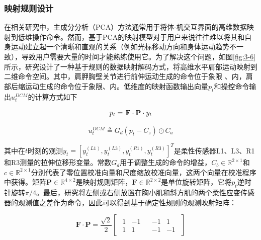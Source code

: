\subsubsection{映射规则设计}
在相关研究中，主成分分析（PCA）方法通常用于将体-机交互界面的高维数据映射到低维操作命令\cite{casadioBodyMachineInterface2011,seanez-gonzalezStaticDynamicDecoding2017}。然而，基于PCA的映射模型对于用户来说往往难以将其和自身运动建立起一个清晰和直观的关系（例如光标移动方向和身体运动趋势不一致），导致用户需要大量的时间才能熟练使用它。为了解决这个问题，如图\ref{fig:3-6}所示，研究设计了一种基于规则的数据映射解码方式，将高维水平肩部运动映射到二维命令空间。其中，肩胛胸壁关节进行前伸运动生成的命令位于象限 \uppercase\expandafter{}、\uppercase\expandafter{}内，肩部后缩运动生成的命令位于象限\uppercase\expandafter{}、\uppercase\expandafter{}内。低维度的映射函数输出向量${p_t}$和操控命令输出$u_t^{DCM}$的计算方式如下

\begin{equation}
{p_t} = {\kern 1pt} \mathbf{{F}} \cdot \mathbf{{P}} \cdot {y_t}
\label{eq1}
\end{equation}   

\begin{equation}
\label{eq2}
u_t^{DCM} \triangleq {G_d}\left( {{p_t} - C_z} \right) \odot C_a
\end{equation}   

其中在$t$时刻的观测${y_t} = {[y_t^{(L1)},y_t^{(L3)},y_t^{(R1)},y_t^{(R3)}]^T}$是柔性传感器L1、L3、R1和R3测量的拉伸位移形变量。常数${G_d}$用于调整生成的命令的增益，$C_b\in {\mathbb{R}^{2 \times 1}}$和$c \in {\mathbb{R}^{2 \times 1}}$分别代表了零位置校准向量和尺度缩放校准向量，这两个向量在校准程序中获得。矩阵$\mathbf{P} \in {\mathbb{R}^{4 \times 2}}$是映射规则矩阵，$\mathbf{F} \in {\mathbb{R}^{2 \times 2}}$是单位旋转矩阵，它将$p_t$逆时针旋转$\pi /4$。最后，研究将左侧或右侧放置在胸小肌和斜方肌的两个柔性应变传感器的观测值之差作为命令，因此可以得到基于确定性规则的观测映射矩阵：

\[{\mathbf{F}} \cdot {\mathbf{P}} = \frac{{\sqrt 2 }}{2}\left[ {\begin{array}{*{20}{c}}
{\begin{array}{*{20}{c}}
1&{ - 1}  \\  
1&1 
\end{array}}&{\begin{array}{*{20}{c}}
{ - 1}&1  \\  
{ - 1}&{ - 1} 
\end{array}} 
\end{array}} \right]\]   

